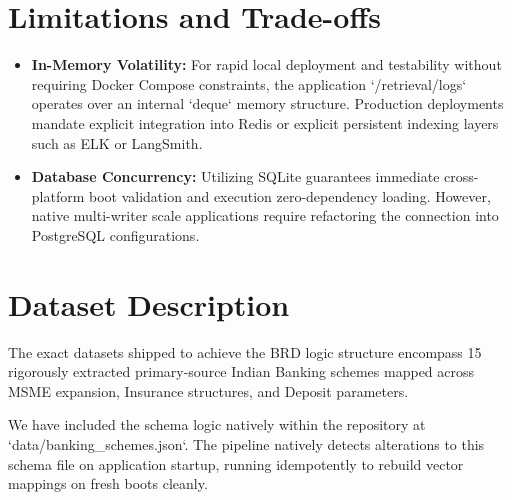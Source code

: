 \documentclass[11pt,a4paper]{article}
\begin{document}
\section{Limitations and Trade-offs}
\begin{itemize}
    \item \textbf{In-Memory Volatility:} For rapid local deployment and testability without requiring Docker Compose constraints, the application `/retrieval/logs` operates over an internal `deque` memory structure. Production deployments mandate explicit integration into Redis or explicit persistent indexing layers such as ELK or LangSmith.
    \item \textbf{Database Concurrency:} Utilizing SQLite guarantees immediate cross-platform boot validation and execution zero-dependency loading. However, native multi-writer scale applications require refactoring the connection into PostgreSQL configurations.
\end{itemize}

\section{Dataset Description}
The exact datasets shipped to achieve the BRD logic structure encompass 15 rigorously extracted primary-source Indian Banking schemes mapped across MSME expansion, Insurance structures, and Deposit parameters.

We have included the schema logic natively within the repository at `data/banking_schemes.json`. The pipeline natively detects alterations to this schema file on application startup, running idempotently to rebuild vector mappings on fresh boots cleanly.
\end{document}
